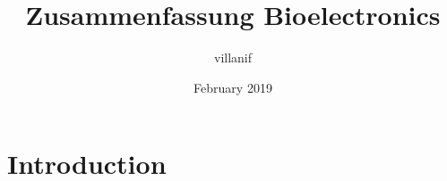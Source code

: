 \documentclass{article}
\title{Zusammenfassung Bioelectronics}
\author{villanif }
\date{February 2019}
\begin{document}
\maketitle

\section{Introduction}
\end{document}
